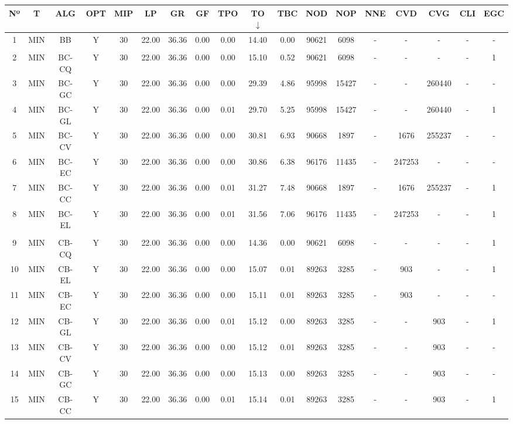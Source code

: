 {
\footnotesize\centering
\hspace*{-5mm}\begin{tabular}{ *{17}{c|} c }
\hline
\textbf{Nº} & \textbf{T} & \textbf{ALG} & \textbf{OPT} & \textbf{MIP} & \textbf{LP} & \textbf{GR} & \textbf{GF} & \textbf{TPO} & \textbf{TO} $\downarrow$ & \textbf{TBC} & \textbf{NOD} & \textbf{NOP} & \textbf{NNE} & \textbf{CVD} & \textbf{CVG} & \textbf{CLI} & \textbf{EGC}\\
\hline
1 & MIN & BB & Y & 30 & 22.00 & 36.36 & 0.00 & 0.00 & 14.40 & 0.00 & 90621 & 6098 & - & - & - & - & -\\
\hline
\multicolumn{18}{c}{}
\\
\hline
2 & MIN & BC-CQ & Y & 30 & 22.00 & 36.36 & 0.00 & 0.00 & 15.10 & 0.52 & 90621 & 6098 & - & - & - & - & 1\\
\hline
3 & MIN & BC-GC & Y & 30 & 22.00 & 36.36 & 0.00 & 0.00 & 29.39 & 4.86 & 95998 & 15427 & - & - & 260440 & - & -\\
\hline
4 & MIN & BC-GL & Y & 30 & 22.00 & 36.36 & 0.00 & 0.01 & 29.70 & 5.25 & 95998 & 15427 & - & - & 260440 & - & 1\\
\hline
5 & MIN & BC-CV & Y & 30 & 22.00 & 36.36 & 0.00 & 0.00 & 30.81 & 6.93 & 90668 & 1897 & - & 1676 & 255237 & - & -\\
\hline
6 & MIN & BC-EC & Y & 30 & 22.00 & 36.36 & 0.00 & 0.00 & 30.86 & 6.38 & 96176 & 11435 & - & 247253 & - & - & -\\
\hline
7 & MIN & BC-CC & Y & 30 & 22.00 & 36.36 & 0.00 & 0.01 & 31.27 & 7.48 & 90668 & 1897 & - & 1676 & 255237 & - & 1\\
\hline
8 & MIN & BC-EL & Y & 30 & 22.00 & 36.36 & 0.00 & 0.01 & 31.56 & 7.06 & 96176 & 11435 & - & 247253 & - & - & 1\\
\hline
\multicolumn{18}{c}{}
\\
\hline
9 & MIN & CB-CQ & Y & 30 & 22.00 & 36.36 & 0.00 & 0.00 & 14.36 & 0.00 & 90621 & 6098 & - & - & - & - & 1\\
\hline
10 & MIN & CB-EL & Y & 30 & 22.00 & 36.36 & 0.00 & 0.00 & 15.07 & 0.01 & 89263 & 3285 & - & 903 & - & - & 1\\
\hline
11 & MIN & CB-EC & Y & 30 & 22.00 & 36.36 & 0.00 & 0.00 & 15.11 & 0.01 & 89263 & 3285 & - & 903 & - & - & -\\
\hline
12 & MIN & CB-GL & Y & 30 & 22.00 & 36.36 & 0.00 & 0.01 & 15.12 & 0.00 & 89263 & 3285 & - & - & 903 & - & 1\\
\hline
13 & MIN & CB-CV & Y & 30 & 22.00 & 36.36 & 0.00 & 0.00 & 15.12 & 0.01 & 89263 & 3285 & - & - & 903 & - & -\\
\hline
14 & MIN & CB-GC & Y & 30 & 22.00 & 36.36 & 0.00 & 0.00 & 15.13 & 0.00 & 89263 & 3285 & - & - & 903 & - & -\\
\hline
15 & MIN & CB-CC & Y & 30 & 22.00 & 36.36 & 0.00 & 0.01 & 15.14 & 0.01 & 89263 & 3285 & - & - & 903 & - & 1\\
\hline
\end{tabular}\\
\vspace{4mm}
}

\newpage

